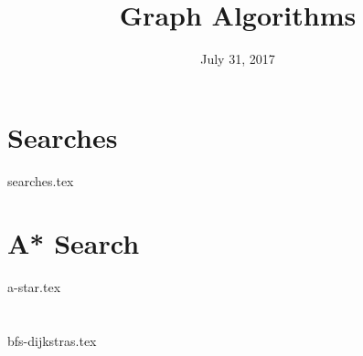 \documentclass{exam}
\title{Graph Algorithms}
\date{July 31, 2017}
\begin{document}
\maketitle

\section{Searches}
\begin{questions}
{searches.tex}
\end{questions}

\clearpage

\section{A* Search}
\begin{questions}
{a-star.tex}
\end{questions}

\clearpage

\section{}
\begin{questions}
{bfs-dijkstras.tex}
\end{questions}
\end{document}
